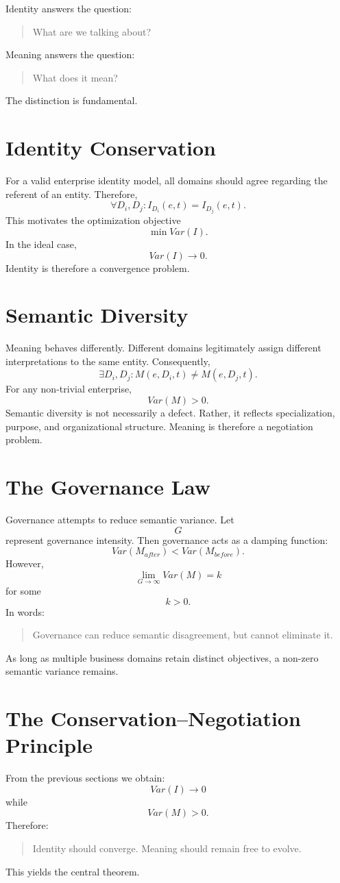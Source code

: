\documentclass[11pt]{article}
\begin{document}
Identity answers the question:
\begin{quote}
What are we talking about?
\end{quote}
Meaning answers the question:
\begin{quote}
What does it mean?
\end{quote}
The distinction is fundamental.

\section{Identity Conservation}
For a valid enterprise identity model, all domains should agree regarding the referent of an entity. Therefore,
\[
\forall D_i,D_j: I_{D_i}(e,t) = I_{D_j}(e,t).
\]
This motivates the optimization objective
\[
\min Var(I).
\]
In the ideal case,
\[
Var(I) \rightarrow 0.
\]
Identity is therefore a convergence problem.

\section{Semantic Diversity}
Meaning behaves differently. Different domains legitimately assign different interpretations to the same entity. Consequently,
\[
\exists D_i,D_j: M(e,D_i,t) \neq M(e,D_j,t).
\]
For any non-trivial enterprise,
\[
Var(M) > 0.
\]
Semantic diversity is not necessarily a defect. Rather, it reflects specialization, purpose, and organizational structure. Meaning is therefore a negotiation problem.

\section{The Governance Law}
Governance attempts to reduce semantic variance. Let
\[
G
\]
represent governance intensity. Then governance acts as a damping function:
\[
Var(M_{after}) < Var(M_{before}).
\]
However,
\[
\lim_{G \rightarrow \infty} Var(M) = k
\]
for some
\[
k > 0.
\]
In words:
\begin{quote}
Governance can reduce semantic disagreement, but cannot eliminate it.
\end{quote}
As long as multiple business domains retain distinct objectives, a non-zero semantic variance remains.

\section{The Conservation--Negotiation Principle}
From the previous sections we obtain:
\[
Var(I) \rightarrow 0
\]
while
\[
Var(M) > 0.
\]
Therefore:
\begin{quote}
Identity should converge. Meaning should remain free to evolve.
\end{quote}
This yields the central theorem.
\end{document}

